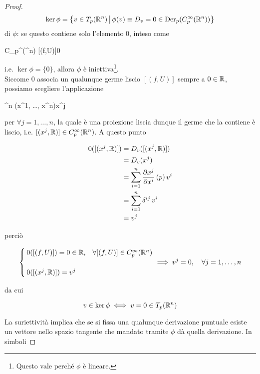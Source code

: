 \begin{proof}
{		\begin{equation*}
			\ker \phi = \left\{ v \in T_{p}(\mathbb{R}^{n}) \, \middle| \, \phi(v) \equiv D_{v} = 0 \in \operatorname{Der}_{p}(C_{p}^{\infty}(\mathbb{R}^{n})) \right\}
		\end{equation*}%
	} di $ \phi $: se questo contiene solo l'elemento $ 0 $, inteso come
	
		{C_{p}^{\infty}(\R^{n})}{\R}
		{[(f,U)]}{0}

	i.e. $ \ker \phi = \{0\} $, allora $ \phi $ è iniettiva\footnote{
		Questo vale perché $ \phi $ è lineare.%
	}.\\
	Siccome $ 0 $ associa un qualunque germe liscio $ [(f,U)] $ sempre a $ 0 \in \mathbb{R} $, possiamo scegliere l'applicazione
	
		{\R^{n}}{\R}
		{(x^{1}, \dots, x^{n})}{x^{j}}

	per $ \forall j=1,\dots,n $, la quale è una proiezione liscia dunque il germe che la contiene è liscio, i.e. $ [(x^{j},\mathbb{R})] \in C_{p}^{\infty}(\mathbb{R}^{n}) $. A questo punto
	
	\begin{align}
		\begin{split}
			0([(x^{j},\mathbb{R})]) &= D_{v} ([(x^{j},\mathbb{R})])\\
			&= D_{v} (x^{j})\\
			&= \sum_{i=1}^{n} \pdv{x^{j}}{x^{i}} \, (p) \, v^{i}\\
			&= \sum_{i=1}^{n} \delta^{ij} \, v^{i}\\
			&= v^{j}
		\end{split}
	\end{align}

	perciò
	
	\begin{equation}
		\begin{cases}
			0([(f,U)]) = 0 \in \R, & \forall [(f,U)] \in C_{p}^{\infty}(\R^{n})\\\\
			0([(x^{j},\R)]) = v^{j}
		\end{cases}%
		 \implies v^{j} = 0 \qcomma \forall j=1,\dots,n
	\end{equation}
	
	da cui
	
	\begin{equation}
		v \in \ker \phi \iff v = 0 \in T_{p}(\mathbb{R}^{n})
	\end{equation}

	La suriettività implica che se si fissa una qualunque derivazione puntuale esiste un vettore nello spazio tangente che mandato tramite $ \phi $ dà quella derivazione. In simboli


\end{proof}
